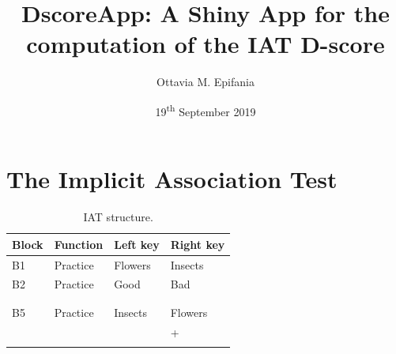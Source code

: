\documentclass[10pt]{beamer}
\begin{document}
\title[]{DscoreApp: A Shiny App for the computation of the IAT D-score}
\author[]{Ottavia M. Epifania}
\date{19\textsuperscript{th} September 2019}


\begin{frame}[plain]
  \titlepage
\end{frame}

%

\section{The Implicit Association Test}
\begin{frame}
\begin{table}[th!]
\centering
\caption{IAT structure.}
\begin{tabularx}{\linewidth}{llll}
\hline
Block  & Function & Left key & Right key \\ \hline
B1  & Practice & Flowers & Insects \\
B2  & Practice & Good & Bad \\
\color{comp}{B3}  & \color{comp}{Practice Mapping A} & \color{comp}{Flowers + Good} & \color{comp}{Insects + Bad} \\
\color{comp}{B4}  & \color{comp}{Test Mapping A} & \color{comp}{Flowers + Good} & \color{comp}{Insects + Bad} \\
B5  & Practice & Insects & Flowers \\
\color{inc}{B6}  & \color{inc}{Practice Mapping B} & \color{inc}{Insects + Good} & \color{inc}{Flowers} + \color{inc}{Bad}\\
\color{inc}{B7}  & \color{inc}{Test Mapping B} & \color{inc}{Insects + Good} & \color{inc}{Flowers + Bad}\\
\hline
\end{tabularx}
\end{table}
\end{frame}
\end{document}
